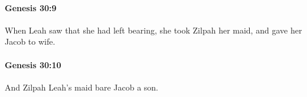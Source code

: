 		\paragraph{Genesis 30:9} %
			\label{GENESIS-30-9}

			When Leah saw that she had left bearing, she took Zilpah her maid, and gave her Jacob to wife.


		\paragraph{Genesis 30:10} %
			\label{GENESIS-30-10}

			And Zilpah Leah's maid bare Jacob a son.


